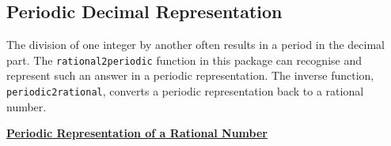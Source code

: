 

\subsection{Periodic Decimal Representation}
\label{sec:rataprx}

The division of one integer by another often results in
a period in the decimal part. The \texttt{rational2periodic}
function in this package can recognise and represent
such an answer in a periodic representation. The inverse
function, \texttt{periodic2rational}, converts a
periodic representation back to a rational number.

\hypertarget{operator:RATIONAL2PERIODIC}{}
\hypertarget{operator:PERIODIC2RATIONAL}{}
\hypertarget{operator:PERIODIC}{}
\textbf{\underline{Periodic Representation of a Rational Number}}

